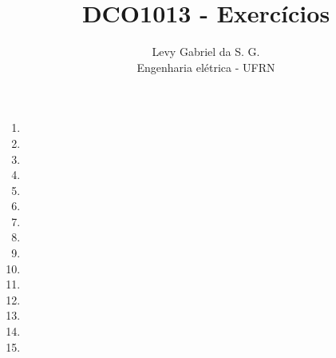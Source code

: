 \title{DCO1013 - Exercícios}
\author{Levy Gabriel da S. G. \\ Engenharia elétrica - UFRN}

\maketitle
\thispagestyle{fancy}

\begin{enumerate}
    \item 
    \item 
    \item 
    \item 
    \item 
    \item 
    \item 
    \item 
    \item 
    \item 
    \item 
    \item 
    \item 
    \item 
    \item 
\end{enumerate}